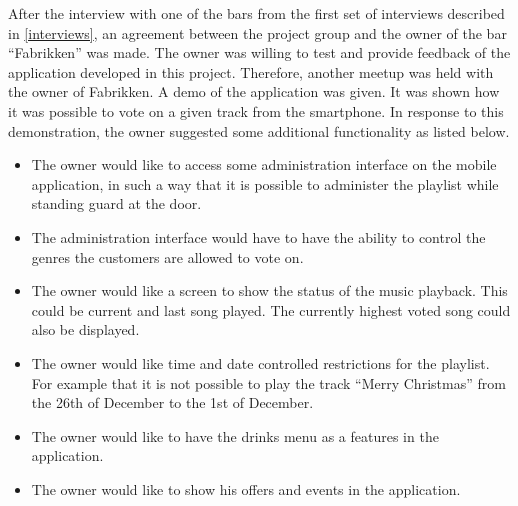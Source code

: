 After the interview with one of the bars from the first set of interviews described in \cref{interviews}, an agreement between the project group and the owner of the bar \enquote{Fabrikken} was made. The owner was willing to test and provide feedback of the application developed in this project. Therefore, another meetup was held with the owner of Fabrikken. A demo of the application was given. It was shown how it was possible to vote on a given track from the smartphone. In response to this demonstration, the owner suggested some additional functionality as listed below.

\begin{itemize}
    \item{The owner would like to access some administration interface on the mobile application, in such a way that it is possible to administer the playlist while standing guard at the door.}
    \item{The administration interface would have to have the ability to control the genres the customers are allowed to vote on.}
    \item{The owner would like a screen to show the status of the music playback. This could be current and last song played. The currently highest voted song could also be displayed.}
    \item{The owner would like time and date controlled restrictions for the playlist. For example that it is not possible to play the track \enquote{Merry Christmas} from the 26th of December to the 1st of December.}
    \item{The owner would like to have the drinks menu as a features in the application.}
    \item{The owner would like to show his offers and events in the application.}
\end{itemize}


